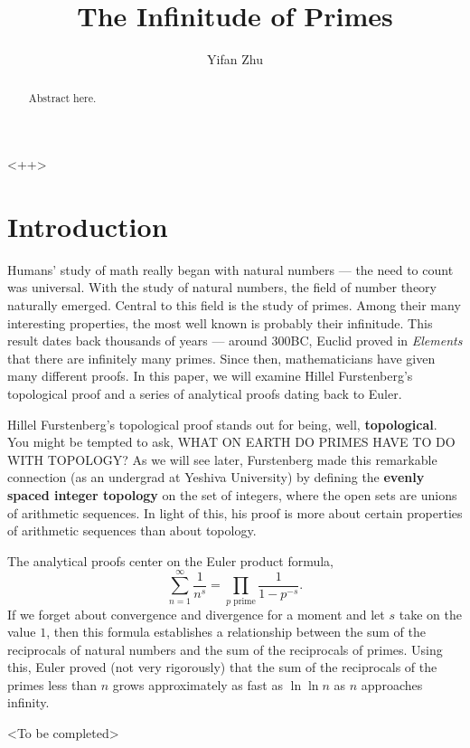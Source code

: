 \documentclass[a4paper]{article}
\theoremstyle{definition}
\theoremstyle{remark}
\begin{document}
\title{The Infinitude of Primes}
\author{
Yifan Zhu
}
\maketitle

\begin{abstract}
  Abstract here.
\end{abstract}<++>

\section{Introduction}
Humans' study of math really began with natural numbers --- the need to count was universal. With the study of natural numbers, the field of number theory naturally emerged. Central to this field is the study of primes. Among their many interesting properties, the most well known is probably their infinitude. This result dates back thousands of years --- around 300BC, Euclid proved in \textit{Elements} that there are infinitely many primes. \cite{bib:mathHistory} Since then, mathematicians have given many different proofs. In this paper, we will examine Hillel Furstenberg's topological proof and a series of analytical proofs dating back to Euler.

Hillel Furstenberg's topological proof stands out for being, well, \textbf{topological}. You might be tempted to ask, {WHAT ON EARTH DO PRIMES HAVE TO DO WITH TOPOLOGY?} As we will see later, Furstenberg made this remarkable connection (as an undergrad at Yeshiva University) by defining the \textbf{evenly spaced integer topology} on the set of integers, where the open sets are unions of arithmetic sequences. In light of this, his proof is more about certain properties of arithmetic sequences than about topology. \cite{bib:proofsFromTheBook} \cite{bib:Furstenberg}

The analytical proofs center on the Euler product formula,
\[
\sum^\infty_{n=1}\frac{1}{n^s}=\prod_{p\text{ prime}}\frac{1}{1-p^{-s}}
.
\]
If we forget about convergence and divergence for a moment and let $s$ take on the value $1$, then this formula establishes a relationship between the sum of the reciprocals of natural numbers and the sum of the reciprocals of primes. Using this, Euler proved (not very rigorously) that the sum of the reciprocals of the primes less than $n$ grows approximately as fast as $\ln\ln n$ as $n$ approaches infinity.

<To be completed>
\end{document}
